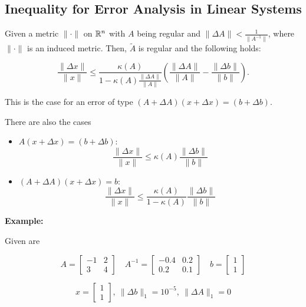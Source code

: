 \subsection{Inequality for Error Analysis in Linear Systems}

Given a metric \(\|\cdot \|\) on \(\mathbb{R}^n\) with \(A\) being regular and \(\|\Delta A\| < \frac{1}{\|A^{-1}\|}\), where \(\|\cdot\|\) is an induced metric. 
Then, \(\tilde{A}\) is regular and the following holds: 

\[
    \frac{\|\Delta x\|}{\|x\|} \le \frac{\kappa(A)}{1 - \kappa(A) \frac{\|\Delta A\|}{\|A\|}} \left(\frac{\|\Delta A\|}{\|A\|} - \frac{\|\Delta b\|}{\|b\|}\right).
\]

This is the case for an error of type \((A + \Delta A)(x + \Delta x) = (b + \Delta b)\). 

There are also the cases 

\begin{itemize}

    \item \(A(x + \Delta x) = (b + \Delta b)\): 
    \[
        \frac{\|\Delta x \|}{\|x\|} \le \kappa(A) \frac{\|\Delta b \| }{\|b\|}
    \]

    \item \((A + \Delta A)(x + \Delta x) = b\): 
    \[
        \frac{\|\Delta x \|}{\|x\|} \le \frac{\kappa(A)}{1 - \kappa(A)} \frac{\|\Delta b \| }{\|b\|}
    \]

\end{itemize}

\textbf{Example:}

Given are 

\[
    A = 
    \begin{bmatrix}
        -1 & 2 \\ 
        3 & 4 
    \end{bmatrix}
    \quad 
    A^{-1} = 
    \begin{bmatrix}
        -0.4 & 0.2 \\ 
        0.2 & 0.1 
    \end{bmatrix}
    \quad 
    b = 
    \begin{bmatrix}
        1 \\ 
        1
    \end{bmatrix}
\]

\[
    x =
    \begin{bmatrix}
        1 \\ 
        1
    \end{bmatrix}
    ,\ 
    \|\Delta b\|_1 = 10^{-5}, \ \|\Delta A \|_1 = 0
\]

